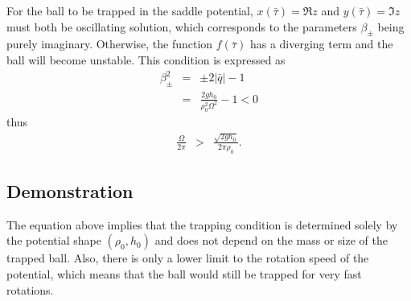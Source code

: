 \documentclass{article}
\begin{document}
For the ball to be trapped in the saddle potential, $x\left(\bar{\tau}\right) = \Re{z}$ and $y\left(\bar{\tau}\right) = \Im{z}$ must both be oscillating solution, which corresponds to the parameters $\beta_\pm$ being purely imaginary. Otherwise, the function $f\left(\bar{\tau}\right)$ has a diverging term and the ball will become unstable. This condition is expressed as
\begin{eqnarray*}
\beta_\pm^2 & = & \pm 2|\bar{q}| - 1 \\
& = & \frac{2gh_0}{\rho_0^2 \Omega^2} - 1 < 0
\end{eqnarray*}
thus
\begin{eqnarray*}
\frac{\Omega}{2\pi} & > & \frac{\sqrt{2gh_0}}{2\pi\rho_0}.
\end{eqnarray*}





\subsection{Demonstration}
The equation above implies that the trapping condition is determined solely by the potential shape $(\rho_0, h_0)$ and does not depend on the mass or size of the trapped ball. Also, there is only a lower limit to the rotation speed of the potential, which means that the ball would still be trapped for very fast rotations.






\begin{thebibliography}{9}

\end{thebibliography}
\end{document}
